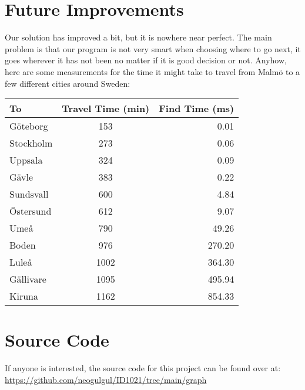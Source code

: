 \documentclass[a4paper, 11pt]{article}
\begin{document}
\section{Future Improvements}
	Our solution has improved a bit, but it is nowhere near perfect.
	The main problem is that our program is not very smart when choosing where to go next,
	it goes wherever it has not been no matter if it is good decision or not.
	Anyhow, here are some measurements for the time it might take to travel from Malmö to a few different cities around Sweden:
	\begin{adjustbox}{center}
		\begin{tabular}{|l|c|r|}
			\hline
			\textbf{To} & \textbf{Travel Time (min)} & \textbf{Find Time (ms)} \\
			\hline
			 Göteborg &  153 &   0.01 \\
			Stockholm &  273 &   0.06 \\
			  Uppsala &  324 &   0.09 \\
			    Gävle &  383 &   0.22 \\
			Sundsvall &  600 &   4.84 \\
			Östersund &  612 &   9.07 \\
			     Umeå &  790 &  49.26 \\
			    Boden &  976 & 270.20 \\
			    Luleå & 1002 & 364.30 \\
			Gällivare & 1095 & 495.94 \\
			   Kiruna & 1162 & 854.33 \\
			\hline
		\end{tabular}
	\end{adjustbox}

\section{Source Code}
	If anyone is interested, the source code for this project can be found over at:
	\url{https://github.com/neogulgul/ID1021/tree/main/graph}
\end{document}
